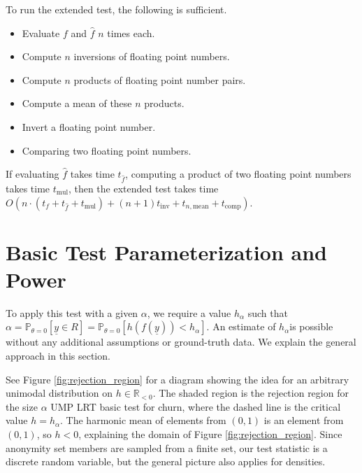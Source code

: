 \documentclass{tran-l}
\theoremstyle{cor}
\theoremstyle{definition}
\theoremstyle{remark}
\theoremstyle{conjecture}
\numberwithin{equation}{section}
\begin{document}
To run the extended test, the following is sufficient.
\begin{itemize}
\item Evaluate $f$ and $\hat{f}$ $n$ times each.
\item Compute $n$ inversions of floating point numbers.
\item Compute $n$ products of floating point number pairs.
\item Compute a mean of these $n$ products.
\item Invert a floating point number.
\item Comparing two floating point numbers.
\end{itemize}

If evaluating $\hat{f}$ takes time $t_{\hat{f}}$, computing a product of two floating point numbers takes time $t_{\text{mul}}$, then the extended test takes time $O(n \cdot (t_f + t_{\hat{f}} + t_{\text{mul}}) + (n+1)t_{\text{inv}} + t_{n, \text{mean}} + t_{\text{comp}})$.


\section{Basic Test Parameterization and Power}\label{sec:basic_parameterization}




To apply this test with a given $\alpha$, we require a value $h_{\alpha}$ such that $\alpha = \mathbb{P}_{\theta=0}\left[\underline{y} \in R\right] = \mathbb{P}_{\theta=0}\left[h(f(\underline{y})) < h_\alpha\right]$.
An estimate of $h_{\alpha}$is possible without any additional assumptions or ground-truth data.
We explain the general approach in this section.

See Figure \ref{fig:rejection_region} for a diagram showing the idea for an arbitrary unimodal distribution on $h \in \mathbb{R}_{< 0}$.
The shaded region is the rejection region for the size $\alpha$ UMP LRT basic test for churn, where the dashed line is the critical value $h=h_\alpha$. The harmonic mean of elements from $(0,1)$ is an element from $(0,1)$, so $h < 0$, explaining the domain of Figure \ref{fig:rejection_region}.
Since anonymity set members are sampled from a finite set, our test statistic is a discrete random variable, but the general picture also applies for densities.
\end{document}

